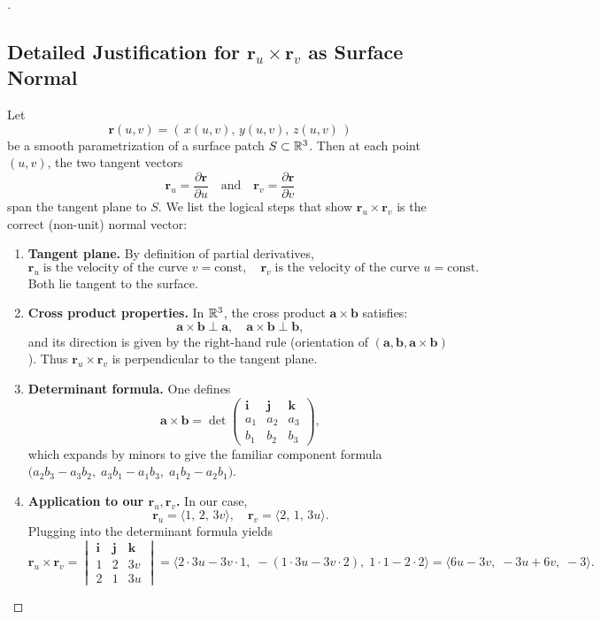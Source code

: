 \documentclass[11pt,openany]{article}
\begin{document}
\begin{proof}[\sol]
\subsection*{Detailed Justification for \(\mathbf r_u\times\mathbf r_v\) as Surface Normal}

Let 
\[
\mathbf r(u,v)=(\,x(u,v),\,y(u,v),\,z(u,v)\,)
\]
be a smooth parametrization of a surface patch \(S\subset\mathbb{R}^3\).  Then at each point \((u,v)\), the two tangent vectors
\[
\mathbf r_u
=\frac{\partial\mathbf r}{\partial u}
\quad\text{and}\quad
\mathbf r_v
=\frac{\partial\mathbf r}{\partial v}
\]
span the tangent plane to \(S\).  We list the logical steps that show
\(\mathbf r_u\times\mathbf r_v\)
is the correct (non-unit) normal vector:

\begin{enumerate}
	\item \textbf{Tangent plane.}  By definition of partial derivatives,
	\[
	\mathbf r_u\;\text{is the velocity of the curve }v=\text{const},
	\quad
	\mathbf r_v\;\text{is the velocity of the curve }u=\text{const}.
	\]
	Both lie tangent to the surface.
	
	\item \textbf{Cross product properties.}  In \(\mathbb{R}^3\), the cross product 
	\(\mathbf a\times\mathbf b\) satisfies:
	\[
	\mathbf a\times\mathbf b
	\perp \mathbf a,
	\quad
	\mathbf a\times\mathbf b
	\perp \mathbf b,
	\]
	and its direction is given by the right-hand rule (orientation of \((\mathbf a,\mathbf b,\mathbf a\times\mathbf b)\)).  Thus
	\(\mathbf r_u\times\mathbf r_v\)
	is perpendicular to the tangent plane.
	
	\item \textbf{Determinant formula.}  One defines
	\[
	\mathbf a\times\mathbf b
	= \det
	\begin{pmatrix}
		\mathbf i & \mathbf j & \mathbf k\\
		a_1        & a_2        & a_3\\
		b_1        & b_2        & b_3
	\end{pmatrix},
	\]
	which expands by minors to give the familiar component formula
	\(\bigl(a_2b_3 - a_3b_2,\; a_3b_1 - a_1b_3,\;a_1b_2 - a_2b_1\bigr)\).
	
	\item \textbf{Application to our \(\mathbf r_u,\mathbf r_v\).}  
	In our case,
	\[
	\mathbf r_u=\langle 1,\,2,\,3v\rangle,
	\quad
	\mathbf r_v=\langle 2,\,1,\,3u\rangle.
	\]
	Plugging into the determinant formula yields
	\[
	\mathbf r_u\times\mathbf r_v
	= 
	\begin{vmatrix}
		\mathbf i & \mathbf j & \mathbf k\\
		1         & 2         & 3v      \\
		2         & 1         & 3u
	\end{vmatrix}
	= \bigl\langle 2\cdot3u-3v\cdot1,\;- (1\cdot3u-3v\cdot2),\;1\cdot1-2\cdot2\bigr\rangle
	=\langle 6u-3v,\;-3u+6v,\;-3\rangle.
	\]
	

\end{enumerate}
\end{proof}
\end{document}
